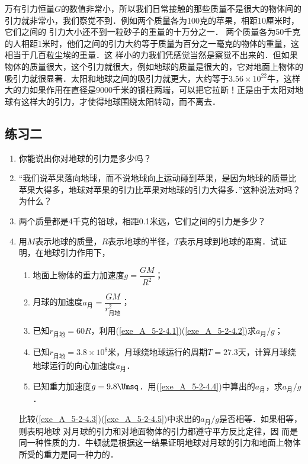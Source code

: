 万有引力恒量$G$的数值非常小，所以我们日常接触的那些质量不是很大的物体间的引力就非常小，我们察觉不到．例如两个质量各为100克的苹果，相距10厘米时，它们之间的
引力大小还不到一粒砂子的重量的十万分之一．
两个质量各为50千克的人相距1米时，他们之间的引力大约等于质量为百分之一毫克的物体的重量，这相当于几百粒尘埃的重量．这
样小的力我们凭感觉当然是察觉不出来的．但如果物体的质量很大，这个引力就很大，例如地球的质量是很大的，它对地面上物体的吸引力就很显著．太阳和地球之间的吸引力就更大，大约等于$3.56\times 10^{22}$牛，这样大的力如果作用在直径是9000千米的钢柱两端，可以把它拉断！正是由于太阳对地球有这样大的引力，才使得地球围绕太阳转动，而不离去．

\subsection*{练习二}
\begin{enumerate}
	\item 你能说出你对地球的引力是多少吗？
\item “我们说苹果落向地球，而不说地球向上运动碰到苹果，是因为地球的质量比苹果大得多，地球对苹果的引力比苹果对地球的引力大得多．”这种说法对吗？为什么？
\item 两个质量都是4千克的铅球，相距0.1米远，它们之间的引力是多少？
\item 用$M$表示地球的质量，$R$表示地球的半径，$T$表示月球到地球的距离．试证明，在地球引力作用下，
\begin{enumerate}
	\item \label{exe_A_5-2-4.1} 
	 地面上物体的重力加速度$g=\dfrac{GM}{R^2}$；
	\item \label{exe_A_5-2-4.2}
	月球的加速度$a_{\text{月}}=\dfrac{GM}{r^2_{\text{月地}}}$；
	\item \label{exe_A_5-2-4.3}
	 已知$r_{\text{月地}}=60R$，利用(\ref{exe_A_5-2-4.1})(\ref{exe_A_5-2-4.2})求$a_{\text{月}}/g$；
	\item \label{exe_A_5-2-4.4} 
	已知$r_{\text{月地}}=3.8\times 10^8$米，月球绕地球运行的周期$T=27.3$天，计算月球绕地球运行的向心加速度$a_{\text{月}}$．
	\item \label{exe_A_5-2-4.5} 
	 已知重力加速度$g=9.8\Umsq$．用(\ref{exe_A_5-2-4.4})中算出的$a_{\text{月}}$，求$a_{\text{月}}/g$．
	

\end{enumerate}
比较(\ref{exe_A_5-2-4.3})(\ref{exe_A_5-2-4.5})中求出的$a_{\text{月}}/g$是否相等．如果相等，则表明地球
对月球的引力和对地面物体的引力都遵守平方反比定律，因
而是同一种性质的力．牛顿就是根据这一结果证明地球对月球的引力和地面上物体所受的重力是同一种力的．
\end{enumerate}


